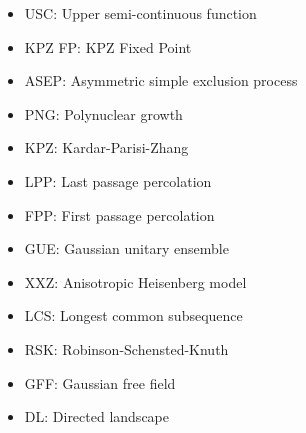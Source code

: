 \documentclass{article}
\theoremstyle{definition}
\begin{document}
\begin{itemize}
		\item USC: Upper semi-continuous function
		\item KPZ FP: KPZ Fixed Point
		\item ASEP: Asymmetric simple exclusion process
		\item PNG: Polynuclear growth
		\item KPZ: Kardar-Parisi-Zhang
		\item LPP: Last passage percolation
		\item FPP: First passage percolation
		\item GUE: Gaussian unitary ensemble
		\item XXZ: Anisotropic Heisenberg model
        \item LCS: Longest common subsequence
		\item RSK: Robinson-Schensted-Knuth
		\item GFF: Gaussian free field
		\item DL: Directed landscape
	\end{itemize}





\end{document}
